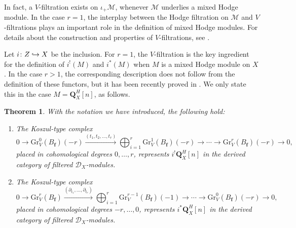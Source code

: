 \documentclass[JEP,XML,SOM,Unicode]{cedram}
\renewcommand{\theenumi}{\alph{enumi}}
\newenvironment{enumeratei}
{\bgroup\def\theenumi{\roman{enumi}}\def\theenumii{\arabic{enumii}}\begin{enumerate}}
{\end{enumerate}\egroup}
\newcommand\hto{\mathrel{\lhook\joinrel\to}}
\newcommand{\DXmodules}{$\cD_X$\nobreakdash-mod\-ules\xspace}
\theoremstyle{plain}
\newtheorem{thm}{Theorem}[section]
\theoremstyle{definition}
\newcommand\Q{{\mathbf Q}}
\newcommand\cD{\mathcal{D}}
\newcommand\cM{\mathcal{M}}
\newcommand\bff{{\boldsymbol f}}
\newcommand\gr{\mathrm{Gr}}
\begin{document}
In fact, a $V$-filtration exists on $\iota_+\cM$, whenever $\cM$ underlies
a mixed Hodge module. In the case $r=1$, the interplay between the Hodge filtration on $\cM$ and $V$-filtrations plays an important role in the definition of mixed Hodge modules. For details about the construction and properties of $V$-filtrations, see \cite{BMS}.

Let $i\colon Z\hto X$ be the inclusion. For $r=1$, the $V$-filtration is the key ingredient for the definition of $i^!(M)$ and $i^*(M)$ when $M$ is a
mixed Hodge module on $X$. In the case $r>1$, the corresponding description does not follow from the definition of these functors, but it has been recently
proved in \cite[Th.\,1.2]{CD}. We only state this in the case $M=\Q_X^H[n]$, as follows.

\begin{thm}\label{thm_CD}
With the notation we have introduced, the following hold:
\begin{enumeratei}
\item\label{thm_CDi}
The Koszul-type complex
\[0\to \gr^0_V(B_\bff)(-r) \xrightarrow{(t_1,t_2,\dots,t_r)} \bigoplus^r_{i=1}\gr^1_V(B_\bff)(-r) \to \cdots \to
\gr^r_V(B_\bff)(-r)\to 0,\]
placed in cohomological degrees $0,\ldots,r$, represents $i^!\Q_X^H[n]$ in the derived category of filtered \DXmodules.
\item\label{thm_CDii}
The Koszul-type complex
\[0\to \gr_V^r(B_{\bff})\xrightarrow{(\partial_{t_1},\dots,\partial_{t_r})} \bigoplus_{i=1}^r\gr_V^{r-1}(B_{\bff})(-1)\to\cdots\to \gr_V^0(B_{\bff})(-r)\to 0,\]
placed in cohomological degrees $-r,\ldots,0$, represents $i^*\Q_X^H[n]$ in the derived category of filtered \DXmodules.
\end{enumeratei}
\end{thm}
\end{document}
